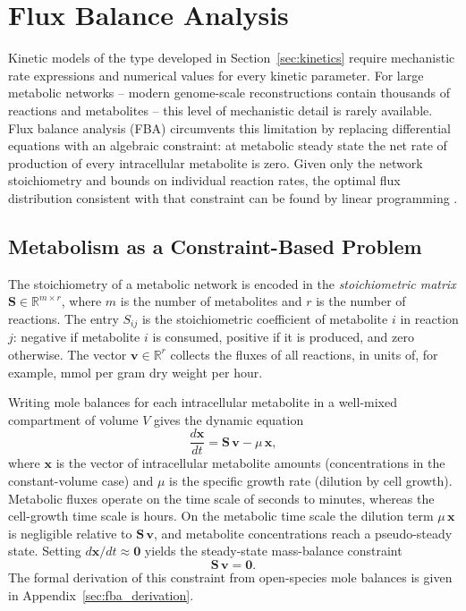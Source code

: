 \section{Flux Balance Analysis}\label{sec:fba}

Kinetic models of the type developed in Section~\ref{sec:kinetics} require
mechanistic rate expressions and numerical values for every kinetic parameter.
For large metabolic networks -- modern genome-scale reconstructions contain
thousands of reactions and metabolites \cite{Thiele2013} -- this level of
mechanistic detail is rarely available.  Flux balance analysis (FBA) circumvents
this limitation by replacing differential equations with an algebraic
constraint: at metabolic steady state the net rate of production of every
intracellular metabolite is zero.  Given only the network stoichiometry and
bounds on individual reaction rates, the optimal flux distribution consistent
with that constraint can be found by linear programming \cite{Orth2010}.

\subsection{Metabolism as a Constraint-Based Problem}

The stoichiometry of a metabolic network is encoded in the
\emph{stoichiometric matrix} $\mathbf{S} \in \mathbb{R}^{m \times r}$, where $m$
is the number of metabolites and $r$ is the number of reactions.  The entry
$S_{ij}$ is the stoichiometric coefficient of metabolite $i$ in reaction $j$:
negative if metabolite $i$ is consumed, positive if it is produced, and zero
otherwise.  The vector $\mathbf{v} \in \mathbb{R}^{r}$ collects the fluxes of
all reactions, in units of, for example, mmol per gram dry weight per hour.

Writing mole balances for each intracellular metabolite in a well-mixed
compartment of volume $V$ gives the dynamic equation
\begin{equation}\label{eq:fba_dynamic}
  \frac{d\mathbf{x}}{dt} = \mathbf{S}\,\mathbf{v} - \mu\,\mathbf{x},
\end{equation}
where $\mathbf{x}$ is the vector of intracellular metabolite amounts
(concentrations in the constant-volume case) and $\mu$ is the specific growth
rate (dilution by cell growth).  Metabolic fluxes
operate on the time scale of seconds to minutes, whereas the cell-growth time
scale is hours.  On the metabolic time scale the dilution term $\mu\,\mathbf{x}$
is negligible relative to $\mathbf{S}\,\mathbf{v}$, and metabolite
concentrations reach a pseudo-steady state.  Setting
$d\mathbf{x}/dt \approx \mathbf{0}$ yields the steady-state mass-balance
constraint
\begin{equation}\label{eq:Sv0}
  \mathbf{S}\,\mathbf{v} = \mathbf{0}.
\end{equation}
The formal derivation of this constraint from open-species mole balances
is given in Appendix~\ref{sec:fba_derivation}.

